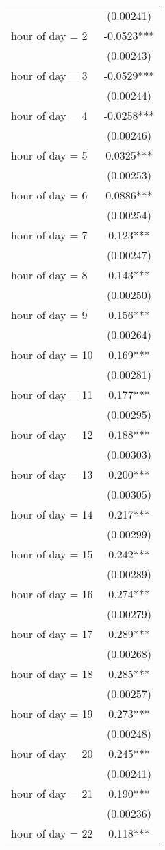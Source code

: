 \begin{tabular}{lc}
 & (0.00241) \\
hour of day = 2 & -0.0523*** \\
 & (0.00243) \\
hour of day = 3 & -0.0529*** \\
 & (0.00244) \\
hour of day = 4 & -0.0258*** \\
 & (0.00246) \\
hour of day = 5 & 0.0325*** \\
 & (0.00253) \\
hour of day = 6 & 0.0886*** \\
 & (0.00254) \\
hour of day = 7 & 0.123*** \\
 & (0.00247) \\
hour of day = 8 & 0.143*** \\
 & (0.00250) \\
hour of day = 9 & 0.156*** \\
 & (0.00264) \\
hour of day = 10 & 0.169*** \\
 & (0.00281) \\
hour of day = 11 & 0.177*** \\
 & (0.00295) \\
hour of day = 12 & 0.188*** \\
 & (0.00303) \\
hour of day = 13 & 0.200*** \\
 & (0.00305) \\
hour of day = 14 & 0.217*** \\
 & (0.00299) \\
hour of day = 15 & 0.242*** \\
 & (0.00289) \\
hour of day = 16 & 0.274*** \\
 & (0.00279) \\
hour of day = 17 & 0.289*** \\
 & (0.00268) \\
hour of day = 18 & 0.285*** \\
 & (0.00257) \\
hour of day = 19 & 0.273*** \\
 & (0.00248) \\
hour of day = 20 & 0.245*** \\
 & (0.00241) \\
hour of day = 21 & 0.190*** \\
 & (0.00236) \\
hour of day = 22 & 0.118*** \\

\end{tabular}
